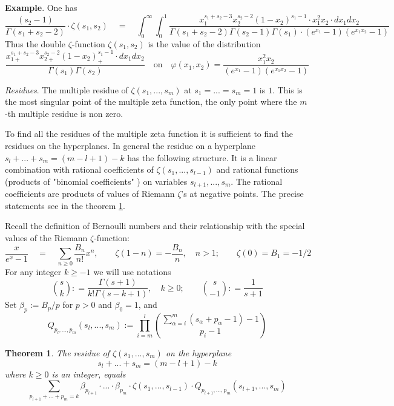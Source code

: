 \documentclass[10pt]{article}
\newtheorem{theorem}{Theorem}[section]
\begin{document}
{\bf  Example}. One has 
$$%
\frac{  (s_2 -1)}{\Gamma(s_1 + s_2 -2) }\cdot\zeta(s_1, s_2)    \quad = \quad \int_0^{\infty}\int_0^{1}\frac{x_1^{s_1+s_2-3}x_2^{s_2-2}  (1-x_2)^{s_1-1} \cdot x_1^2x_2 
\cdot dx_1dx_2}{\Gamma(s_1 + s_2 -2) \Gamma(  s_2 -1)  \Gamma(  s_1 ) \cdot 
(e^{x_1 } -1)(e^{ x_1x_2} -1)}  
$$%
Thus the double $\zeta$-function $\zeta(s_1, s_2)$ is the value of the distribution
$$
 \frac{x_{1+}^{s_1+s_2-3}x_{2+}^{s_2-2}(1-x_2)_+^{s_1-1}    \cdot dx_1dx_2}
{\Gamma(  s_1 )\Gamma(  s_2 )   }  
\quad \mbox{on} \quad 
\varphi(x_1,x_2) = \frac{x_1^2x_2}{(e^{x_1} -1)(e^{x_1x_2} -1)}
$$


{\it Residues}. 
The multiple residue of $\zeta(s_1, ... , s_m)$ at $s_1 = ... = s_m =1$ is $1$.
This is the most singular point of the multiple zeta function, 
the only point where the $m$-th multiple residue is non zero.

To find all the residues of the 
multiple zeta function  it is sufficient to find the residues on the hyperplanes.  
In general the residue on a hyperplane $s_l + ... + s_m = (m-l+1) -k$ has the following structure. It is a linear combination with rational coefficients  of   $\zeta(s_1,...,s_{l-1})$ and rational  functions (products of "binomial coefficients" ) on variables $s_{l+1},...,s_m$. The  rational coefficients are products of values of Riemann $\zeta$'s at negative points.  The precise statements see in the theorem \ref{rezid}.

Recall the definition of Bernoulli numbers and their relationship 
with the special values of the Riemann $\zeta$-function:
$$
\frac{x}{e^x-1} \quad =\quad  \sum_{n\geq 0}\frac{B_n}{n!}x^n, 
\qquad
\zeta(1-n) = -\frac{B_n}{n}, \quad n>1; \qquad  \zeta( 0) =  B_1 = -1/2 
$$
For any integer $k \geq -1$ we will use notations
$$
\binom{ s }{ k }: = \frac{\Gamma(s+1)}{k!\Gamma(s-k+1)},\quad k \geq 0; \qquad  \binom{ s }{ -1 }: = \frac{1}{s+1} 
$$
  Set $\beta_p:= B_p/p$ for $p>0$ and $\beta_0= 1$, and 
$$
Q_{p_l,...,p_m}(s_l,  ... , s_m):= \prod_{i=m}^{l} \binom{\sum_{\alpha =i}^m(s_{\alpha}
 + p_{\alpha} -1) -1 }{ p_i-1} 
$$
 \begin{theorem} \label{rezid}
 The residue of $\zeta(s_1,...,s_m)$ on the hyperplane 
\begin{equation} \label{hypk}
s_l + ... + s_m = (m-l+1) -k 
\end{equation}
 where $k \geq 0$ is an integer, equals
$$
\sum_{p_{l+1}+...+p_m =k} \beta_{p_{l+1}}\cdot ... \cdot \beta_{p_m} \cdot\zeta(s_1,...,s_{l-1}) \cdot Q_{p_{l+1},...,p_m}(s_{l+1},  ... , s_m)  
$$
\end{theorem}
 
\end{document}
